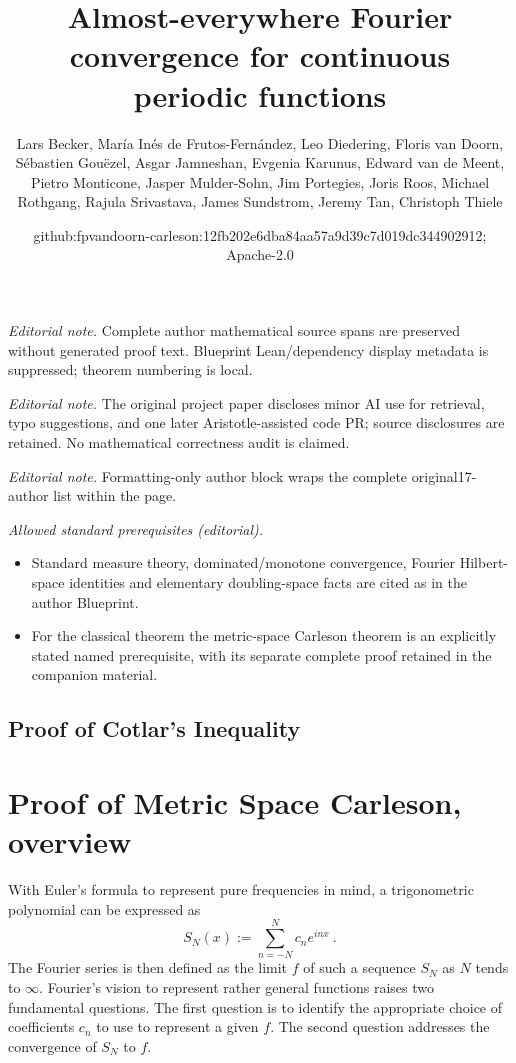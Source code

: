 \documentclass[10pt,a4paper]{article}
\title{Almost-everywhere Fourier convergence for continuous periodic functions}
\author{Lars Becker, María Inés de Frutos-Fernández, Leo Diedering, Floris van Doorn, Sébastien Gouëzel, Asgar Jamneshan, Evgenia Karunus, Edward van de Meent, Pietro Monticone, Jasper Mulder-Sohn, Jim Portegies, Joris Roos, Michael Rothgang, Rajula Srivastava, James Sundstrom, Jeremy Tan, Christoph Thiele}
\date{github:fpvandoorn-carleson:12fb202e6dba84aa57a9d39c7d019dc344902912; Apache-2.0}
\theoremstyle{plain}
\theoremstyle{definition}
\numberwithin{equation}{subsection}
\begin{document}
\maketitle
\noindent\textit{Editorial note.} Complete author mathematical source spans are preserved without generated proof text. Blueprint Lean/dependency display metadata is suppressed; theorem numbering is local.\par\medskip
\noindent\textit{Editorial note.} The original project paper discloses minor AI use for retrieval, typo suggestions, and one later Aristotle-assisted code PR; source disclosures are retained. No mathematical correctness audit is claimed.\par\medskip
\noindent\textit{Editorial note.} Formatting-only author block wraps the complete original17-author list within the page.\par\medskip
\noindent\textit{Allowed standard prerequisites (editorial).}\begin{itemize}
\item Standard measure theory, dominated/monotone convergence, Fourier Hilbert-space identities and elementary doubling-space facts are cited as in the author Blueprint.
\item For the classical theorem the metric-space Carleson theorem is an explicitly stated named prerequisite, with its separate complete proof retained in the companion material.
\end{itemize}\medskip
\subsection{Proof of Cotlar's Inequality}
\label{subsec-cotlar}


\section{Proof of Metric Space Carleson, overview}
\label{overviewsection}


With Euler's formula to represent pure frequencies in mind, a trigonometric polynomial can be expressed as
\begin{equation}\label{eq:trig-series}
    S_N(x):= \sum_{n=-N}^N c_n e^{inx} \ .
\end{equation}
The Fourier series is then defined as the limit $f$ of such a sequence $S_N$
as $N$ tends to $\infty$. Fourier's vision to represent rather general
functions raises two fundamental questions. The first question is to identify
the appropriate choice of coefficients $c_n$ to use to represent a given $f$.
The second question addresses the convergence of $S_N$ to $f$.
\end{document}
